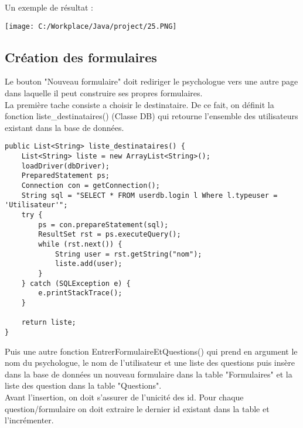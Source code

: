\documentclass[12]{article}
\begin{document}
Un exemple de résultat :


\begin{center}
\texttt{[image: C:/Workplace/Java/project/25.PNG]}
\end{center}



\subsection{Création des formulaires}



Le bouton "Nouveau formulaire" doit rediriger le psychologue vers une autre page dans laquelle il peut construire ses propres formulaires.\\

La première tache consiste a choisir le destinataire. De ce fait, on définit la fonction liste\_destinataires() (Classe DB) qui retourne l'ensemble des utilisateurs existant dans la base de données.
\newpage



\begin{footnotesize}
\lstset{language=java}
\begin{lstlisting}
public List<String> liste_destinataires() {
	List<String> liste = new ArrayList<String>();
	loadDriver(dbDriver);
	PreparedStatement ps;
	Connection con = getConnection();
	String sql = "SELECT * FROM userdb.login l Where l.typeuser = 'Utilisateur'";
	try {
		ps = con.prepareStatement(sql);
		ResultSet rst = ps.executeQuery();
		while (rst.next()) {
			String user = rst.getString("nom");
			liste.add(user);
		}
	} catch (SQLException e) {
		e.printStackTrace();
	}

	return liste;
}
\end{lstlisting}
\end{footnotesize}



Puis une autre fonction EntrerFormulaireEtQuestions() qui prend en argument le nom du psychologue, le nom de l'utilisateur et une liste des questions puis insère dans la base de données un nouveau formulaire dans la table "Formulaires" et la liste des question dans la table "Questions".\\

Avant l'insertion, on doit s'assurer de l'unicité des id. Pour chaque question/formulaire on doit extraire le dernier id existant dans la table et l'incrémenter.
\end{document}

